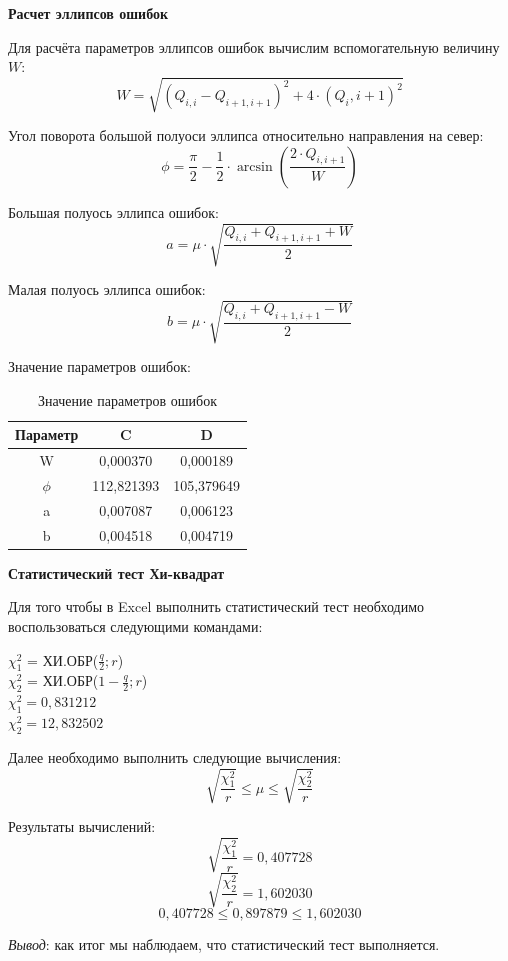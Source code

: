 \documentclass[a4paper]{article}
\begin{document}
{\begin{center}
    \Large{\textbf{Расчет эллипсов ошибок }}
\end{center}
\par Для расчёта параметров эллипсов ошибок вычислим
вспомогательную величину $W$:
\begin{equation}
    W = \sqrt{\left(Q_{i,i} - Q_{i+1,i+1}\right)^2 + 4 \cdot \left(Q_i,i + 1 \right)^2 }
\end{equation}
\par Угол поворота большой полуоси эллипса относительно
направления на север:
\begin{equation}
    \phi = \frac{\pi}{2} - \frac{1}{2} \cdot \arcsin \left({\frac{2 \cdot Q_{i,i+1}}{W}} \right)
\end{equation}
\par Большая полуось эллипса ошибок:
\begin{equation}
    a = \mu \cdot \sqrt{\frac{Q_{i,i} + Q_{i+1,i+1} + W}{2}}
\end{equation}
\par Малая полуось эллипса ошибок:
\begin{equation}
    b = \mu \cdot \sqrt{\frac{Q_{i,i} + Q_{i+1,i+1} - W}{2}}
\end{equation}
\par Значение параметров ошибок:

\begin{table}[h]
    \centering
    \caption{Значение параметров ошибок}
    \begin{tabular}{|c|c|c|}
    \hline
        Параметр & C & D \\
        \hline
        W & 0,000370 & 0,000189 \\
        \hline
        $\phi$ & 112,821393 & 105,379649 \\
        \hline
        a & 0,007087 & 0,006123 \\
        \hline
        b & 0,004518 & 0,004719 \\
        \hline
    \end{tabular}
\end{table}

\begin{center}
    \Large{{\textbf{Статистический тест Хи-квадрат}}}
\end{center}
\par Для того чтобы в Excel выполнить статистический тест необходимо воспользоваться следующими командами: 
\begin{center}
    $\chi^{2}_1$ = ХИ.ОБР($\frac{q}{2};r$)\\
    $\chi^{2}_2$ = ХИ.ОБР($1-\frac{q}{2};r$)\\
    $\chi^{2}_1 = 0,831212$\\
    $\chi^{2}_2 = 12,832502$
\end{center}
\par Далее необходимо выполнить следующие вычисления:
$$\sqrt{\frac{\chi^{2}_1}{r}}\leq\mu\leq\sqrt{\frac{\chi^{2}_2}{r}}$$
\par Результаты вычислений:
$$\sqrt{\frac{\chi^{2}_1}{r}} = 0,407728$$
$$\sqrt{\frac{\chi^{2}_2}{r}} = 1,602030$$
$$0,407728\leq0,897879\leq1,602030$$
\par \textit{Вывод}: как итог мы наблюдаем, что статистический тест выполняется. 
}
\end{document}
